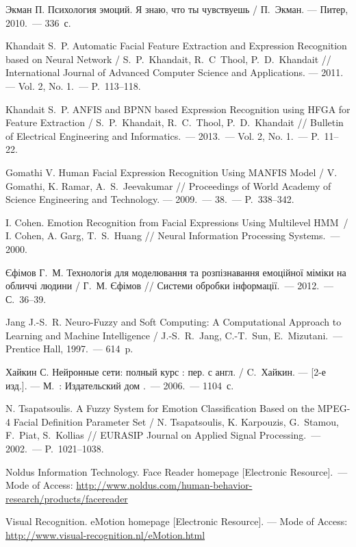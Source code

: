 \begin{thebibliography}
	 Экман П. Психология эмоций. Я знаю, что ты чувствуешь / П.~Экман. --- Питер, 2010.~--- 336~с.

	 Khandait S.~P. Automatic Facial Feature Extraction and Expression 
Recognition based on Neural Network / S.~P.~Khandait, R.~C~Thool, P.~D.~Khandait // International Journal of Advanced Computer Science and Applications. --- 2011. --- Vol. 2, No. 1.~--- P.~113--118.

	 Khandait S.~P. ANFIS and BPNN based Expression Recognition using HFGA for Feature Extraction / S.~P.~Khandait, R.~C.~Thool, P.~D.~Khandait // Bulletin of Electrical Engineering and Informatics.~--- 2013.~--- Vol. 2, No. 1.~--- P.~11--22.

	  Gomathi V. Human Facial Expression Recognition Using MANFIS Model / V. Gomathi, K. Ramar, A.~S.~Jeevakumar // Proceedings of World Academy of Science Engineering and Technology. --- 2009.~--- 38.~--- P.~338--342.

	 I. Cohen. Emotion Recognition from Facial Expressions Using Multilevel HMM~/ I. Cohen, A. Garg, T.~S.~Huang // Neural Information Processing Systems.~--- 2000.

	 Єфімов Г.~М. Технологія для моделювання та розпізнавання емоційної міміки на обличчі людини / Г.~М. Єфімов // Системи обробки інформації.~--- 2012.~--- С.~36--39.
	
	 Jang J.-S.~R. Neuro-Fuzzy and Soft Computing: A Computational Approach to Learning and Machine Intelligence / J.-S.~R.~Jang, C.-T.~Sun, E.~Mizutani.~--- Prentice Hall, 1997.~--- 614~p.
	
	  Хайкин С. Нейронные сети: полный курс : пер. с англ. / C.~Хайкин. --- [2-е изд.]. --- М.~: Издательский дом .~--- 2006.~--- 1104~с.
	
	  N. Tsapatsoulis. A Fuzzy System for Emotion Classification Based on the MPEG-4 Facial Definition Parameter Set / N. Tsapatsoulis, K. Karpouzis, G.~Stamou, F.~Piat, S.~Kollias // EURASIP Journal on Applied Signal Processing.~--- 2002.~--- P.~1021--1038.
	
	 Noldus Information Technology. Face Reader homepage [Electronic Resource].~--- Mode of Access:
\url{http://www.noldus.com/human-behavior-research/products/facereader}

	 Visual Recognition. eMotion homepage [Electronic Resource]. --- Mode of Access: 
\url{http://www.visual-recognition.nl/eMotion.html}


\end{thebibliography}
